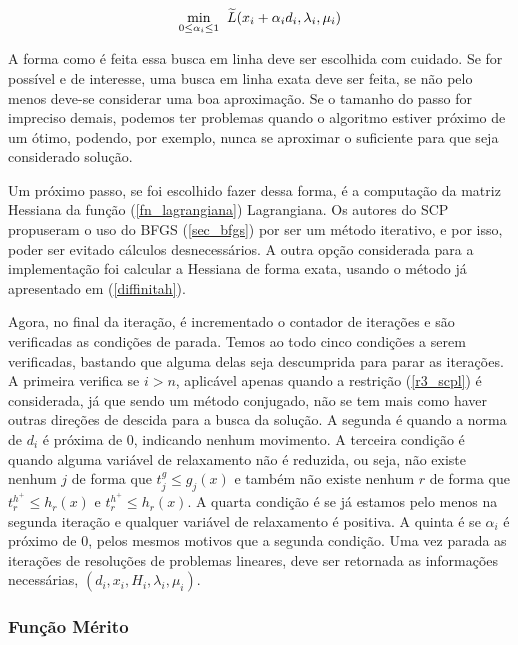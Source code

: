 \begin{equation}
  \underset{0\leq \alpha_i \leq 1}{\mathrm{min}}\hspace{0.2cm}  \widetilde{L}(x_i + \alpha_i d_i, \lambda_i, \mu_i)
\end{equation}

A forma como é feita essa busca em linha deve ser escolhida com cuidado. Se
for possível e de interesse, uma busca em linha exata deve ser feita, se não
pelo menos deve-se considerar uma boa aproximação. Se o tamanho do passo for
impreciso demais, podemos ter problemas quando o algoritmo estiver próximo
de um ótimo, podendo, por exemplo, nunca se aproximar o suficiente para
que seja considerado solução.

Um próximo passo, se foi escolhido fazer dessa forma, é a computação
da matriz Hessiana da função (\ref{fn_lagrangiana}) Lagrangiana. Os autores do
SCP propuseram o uso do BFGS (\ref{sec_bfgs}) por ser um método iterativo, e
por isso, poder ser evitado cálculos desnecessários. A outra opção considerada
para a implementação foi calcular a Hessiana de forma exata, usando o método
já apresentado em (\ref{diffinitah}).




Agora, no final da iteração, é incrementado o contador de iterações e são verificadas
as condições de parada. Temos ao todo cinco condições a serem verificadas, bastando
que alguma delas seja descumprida para parar as iterações. A primeira verifica se
\(i > n\), aplicável apenas quando a restrição (\ref{r3_scpl}) é considerada, já
que sendo um método conjugado, não se tem mais como haver outras direções de descida
para a busca da solução. A segunda é quando a norma de \(d_i\) é próxima de 0, indicando
nenhum movimento. A terceira condição é quando alguma variável de relaxamento não é
reduzida, ou seja, não existe nenhum \(j\) de forma que \(t^g_j \leq g_j(x)\) e
também não existe nenhum \(r\) de forma que
\(t^{h^+}_r \leq h_r(x)\) e  \(t^{h^+}_r \leq h_r(x)\). A quarta condição é se já estamos
pelo menos na segunda iteração e qualquer variável de relaxamento é positiva. A quinta
é se \(\alpha_i\) é próximo de 0, pelos mesmos motivos que a segunda condição. Uma vez
parada as iterações de resoluções de problemas lineares, deve ser retornada as informações
necessárias, \((d_i, x_i, H_i, \lambda_i, \mu_i)\).

\subsubsection{Função Mérito}

